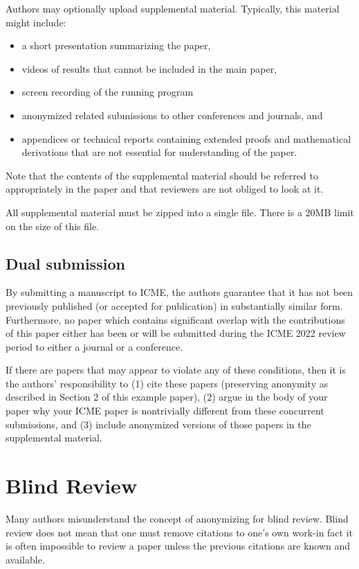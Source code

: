 \documentclass{article}
\begin{document}
Authors may optionally upload supplemental material. Typically, this material might include:
\begin{itemize}
  \item a short presentation summarizing the paper,
  \item videos of results that cannot be included in the main paper,
  \item screen recording of the running program
  \item anonymized related submissions to other conferences and journals, and
  \item appendices or technical reports containing extended proofs and mathematical derivations that are not essential for understanding of the paper.
\end{itemize}

Note that the contents of the supplemental material should be referred to appropriately in the paper and that reviewers are not obliged to look at it.

All supplemental material must be zipped into a single file. There is a 20MB limit on the size of this file.

\subsection{Dual submission}

By submitting a manuscript to ICME, the authors guarantee that it has not been previously published (or accepted for publication) in substantially similar form. Furthermore, no paper which contains significant overlap with the contributions of this paper either has been or will be submitted during the ICME 2022 review period to either a journal or a conference.

If there are papers that may appear to violate any of these conditions, then it is the authors' responsibility to (1) cite these papers (preserving anonymity as described in Section 2 of this example paper), (2) argue in the body of your paper why your ICME paper is nontrivially different from these concurrent submissions, and (3) include anonymized versions of those papers in the supplemental material.

\section{Blind Review}

Many authors misunderstand the concept of anonymizing for blind review. Blind review does not mean that one must remove citations to one's own work-in fact it is often impossible to review a paper unless the previous citations are known and available.
\end{document}
